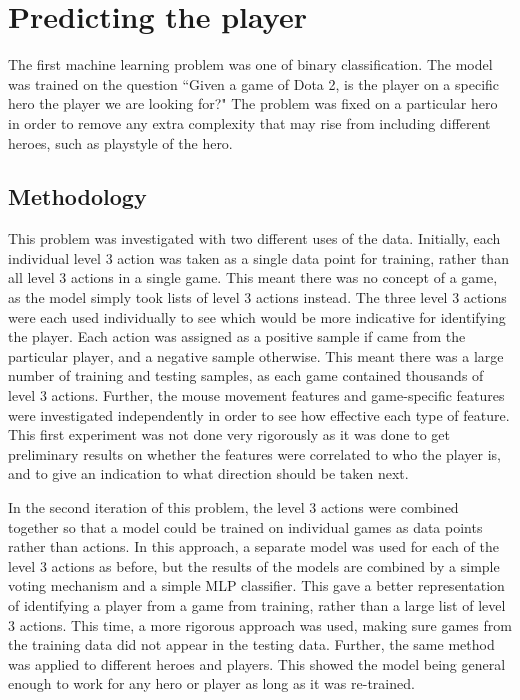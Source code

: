 \documentclass{../sty/SizheArticle}
\begin{document}
\section{Predicting the player}
The first machine learning problem was one of binary classification. The model was trained on the question ``Given a game of Dota 2, is the player on a specific hero the player we are looking for?" The problem was fixed on a particular hero in order to remove any extra complexity that may rise from including different heroes, such as playstyle of the hero. 


\subsection{Methodology}
This problem was investigated with two different uses of the data.  Initially, each individual level 3 action was taken as a single data point for training, rather than all level 3 actions in a single game. This meant there was no concept of a game, as the model simply took lists of level 3 actions instead. The three level 3 actions were each used individually to see which would be more indicative for identifying the player. Each action was assigned as a positive sample if came from the particular player, and a negative sample otherwise. This meant there was a large number of training and testing samples, as each game contained thousands of level 3 actions. Further, the mouse movement features and game-specific features were investigated independently in order to see how effective each type of feature. This first experiment was not done very rigorously as it was done to get preliminary results on whether the features were correlated to who the player is, and to give an indication to what direction should be taken next. 

In the second iteration of this problem, the level 3 actions were combined together so that a model could be trained on individual games as data points rather than actions. In this approach, a separate model was used for each of the level 3 actions as before, but the results of the models are combined by a simple voting mechanism and a simple MLP classifier. This gave a better representation of identifying a player from a game from training, rather than a large list of level 3 actions. This time, a more rigorous approach was used, making sure games from the training data did not appear in the testing data. Further, the same method was applied to different heroes and players. This showed the model being general enough to work for any hero or player as long as it was re-trained. 
\end{document}
